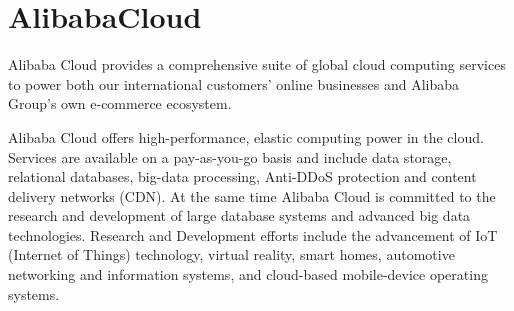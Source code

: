 \section{AlibabaCloud}
Alibaba Cloud provides a comprehensive suite of global cloud computing services
to power both our international customers’ online businesses and Alibaba Group’s
own e-commerce ecosystem.

Alibaba Cloud offers high-performance, elastic computing power in the cloud.
Services are available on a pay-as-you-go basis and include data storage,
relational databases, big-data processing, Anti-DDoS protection and content
delivery networks (CDN). At the same time Alibaba Cloud is committed to the
research and development of large database systems and advanced big data
technologies. Research and Development efforts include the advancement of IoT
(Internet of Things) technology, virtual reality, smart homes, automotive
networking and information systems, and cloud-based mobile-device operating
systems. \cite{AlibabaCloud}